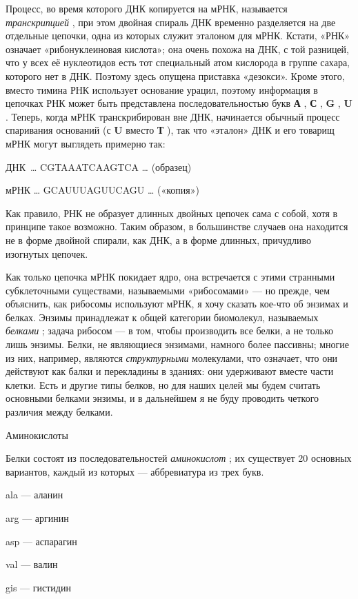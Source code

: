 \documentclass[../main.tex]{subfiles}
\begin{document}
Процесс, во время которого ДНК копируется на мРНК, называется \emph{транскрипцией} , при этом двойная спираль ДНК временно разделяется на две отдельные цепочки, одна из которых служит эталоном для мРНК. Кстати, «РНК» означает «рибонуклеиновая кислота»; она очень похожа на ДНК, с той разницей, что у всех её нуклеотидов есть тот специальный атом кислорода в группе сахара, которого нет в ДНК. Поэтому здесь опущена приставка «дезокси». Кроме этого, вместо тимина РНК использует основание урацил, поэтому информация в цепочках РНК может быть представлена последовательностью букв \textbf{А} , \textbf{С} , \textbf{G} , \textbf{U} . Теперь, когда мРНК транскрибирован вне ДНК, начинается обычный процесс спаривания оснований (с \textbf{U} вместо \textbf{Т} ), так что «эталон» ДНК и его товарищ мРНК могут выглядеть примерно так:

ДНК~\ldots{} CGTAAATCAAGTCA \ldots{} (образец)

мРНК \ldots{} GCAUUUAGUUCAGU \ldots{} («копия»)

Как правило, РНК не образует длинных двойных цепочек сама с собой, хотя в принципе такое возможно. Таким образом, в большинстве случаев она находится не в форме двойной спирали, как ДНК, а в форме длинных, причудливо изогнутых цепочек.

Как только цепочка мРНК покидает ядро, она встречается с этими странными субклеточными существами, называемыми «рибосомами» --- но прежде, чем объяснить, как рибосомы используют мРНК, я хочу сказать кое-что об энзимах и белках. Энзимы принадлежат к общей категории биомолекул, называемых \emph{белками} ; задача рибосом --- в том, чтобы производить все белки, а не только лишь энзимы. Белки, не являющиеся энзимами, намного более пассивны; многие из них, например, являются \emph{структурными} молекулами, что означает, что они действуют как балки и перекладины в зданиях: они удерживают вместе части клетки. Есть и другие типы белков, но для наших целей мы будем считать основными белками энзимы, и в дальнейшем я не буду проводить четкого различия между белками.

Аминокислоты

Белки состоят из последовательностей \emph{аминокислот} ; их существует 20 основных вариантов, каждый из которых --- аббревиатура из трех букв.

ala --- аланин

arg --- аргинин

asp --- аспарагин

val --- валин

gis --- гистидин
\end{document}
